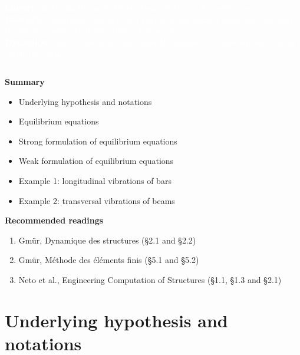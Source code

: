 \documentclass[aspectratio=169]{beamer}
\begin{document}
{{\begin{frame}
\begin{columns}
        \parbox{\linewidth}{%
          \textbf{\textcolor{white}{\large Linear:}} \textcolor{white}{infinitesimally small deformations relative to the solid's size.} \\[0.9cm]
          \textbf{\textcolor{white}{\large Elasticity:}} \textcolor{white}{deformable material that returns to its original shape and size when the forces causing the deformation are removed.} \\[0.9cm]
          \textbf{\textcolor{white}{\large Dynamics:}} \textcolor{white}{study bodies in motion under the influence of time-dependent loads applied to them.}
        }
      \end{columns}
    \end{frame}
  }

  \begin{frame}
    \textbf{\large Summary}
    \begin{itemize}
      \item Underlying hypothesis and notations
      \item Equilibrium equations
      \item Strong formulation of equilibrium equations
      \item Weak formulation of equilibrium equations
      \item Example 1: longitudinal vibrations of bars
      \item Example 2: transversal vibrations of beams
    \end{itemize}
    \vspace{.5cm}

    \textbf{\large Recommended readings}
    \begin{enumerate}
      \item Gmür, Dynamique des structures (§2.1 and §2.2)
      \item Gmür, Méthode des éléments finis (§5.1 and §5.2)
      \item Neto et al., Engineering Computation of Structures (§1.1, §1.3 and §2.1)
    \end{enumerate}
  \end{frame}
}

\section{Underlying hypothesis and notations}
\end{document}
